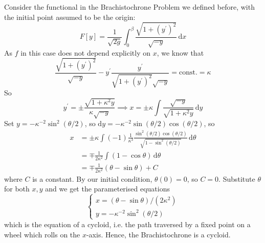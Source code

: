 \documentclass[a4paper]{article}
\begin{document}
\begin{example}
    Consider the functional in the Brachistochrone Problem we defined before, with the initial point assumed to be the origin:
    $$F[y]=\frac{1}{\sqrt{2g}}\int_0^\beta\frac{\sqrt{1+(y^\prime)^2}}{\sqrt{-y}}\,\mathrm dx$$
    As $f$ in this case does not depend explicitly on $x$, we know that
    $$\frac{\sqrt{1+(y^\prime)^2}}{\sqrt{-y}}-y^\prime\frac{y^\prime}{\sqrt{1+(y^\prime)^2}\sqrt{-y}}=\text{const.}=\kappa$$
    So
    $$y^\prime=\pm\frac{\sqrt{1+\kappa^2y}}{\kappa\sqrt{-y}}\implies x=\pm \kappa\int\frac{\sqrt{-y}}{\sqrt{1+\kappa^2y}}\,\mathrm dy$$
    Set $y=-\kappa^{-2}\sin^2(\theta/2)$, so $\mathrm dy=-\kappa^{-2}\sin(\theta/2)\cos(\theta/2)$, so
    \begin{align*}
        x&=\pm \kappa\int(-1)\frac{1}{\kappa^3}\frac{\sin^2(\theta/2)\cos(\theta/2)}{\sqrt{1-\sin^2(\theta/2)}}\,\mathrm d\theta\\
        &=\mp\frac{1}{2\kappa^2}\int(1-\cos\theta)\,\mathrm d\theta\\
        &=\mp\frac{1}{2\kappa^2}(\theta-\sin\theta)+C
    \end{align*}
    where $C$ is a constant.
    By our initial condition, $\theta(0)=0$, so $C=0$.
    Substitute $\theta$ for both $x,y$ and we get the parameterised equations
    $$\begin{cases}
        x=(\theta-\sin\theta)/(2\kappa^2)\\
        y=-\kappa^{-2}\sin^2(\theta/2)
    \end{cases}$$
    which is the equation of a cycloid, i.e. the path traversed by a fixed point on a wheel which rolls on the $x$-axis.
    Hence, the Brachistochrone is a cycloid.

    \begin{center}
\end{center}
\end{example}
\end{document}
